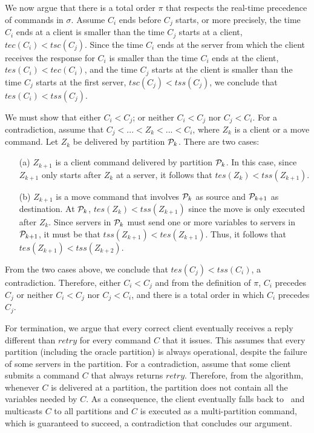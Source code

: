 %
We now argue that there is a total order $\pi$ that respects the real-time precedence of commands in $\sigma$.
Assume $C_i$ ends before $C_j$ starts, or more precisely, the time $C_i$ ends at a client is smaller than the time $C_j$ starts at a client, $tec(C_i) < tsc(C_j)$.
Since the time $C_i$ ends at the server from which the client receives the response for $C_i$ is smaller than the time $C_i$ ends at the client, $tes(C_i) < tec(C_i)$, and the time $C_j$ starts at the client is smaller than the time $C_j$ starts at the first server, $tsc(C_j) < tss(C_j)$, we conclude that $tes(C_i) < tss(C_j)$.

We must show that either $C_i < C_j$; or neither $C_i < C_j$ nor $C_j < C_i$.
For a contradiction, assume that $C_j < ... < Z_k < ... < C_i$, where $Z_k$ is a client or a move command.
Let $Z_k$ be delivered by partition $\mathcal{P}_k$.
There are two cases: 
\begin{enumerate}
\item[(a)] $Z_{k+1}$ is a client command delivered by partition $\mathcal{P}_k$.
In this case, since $Z_{k+1}$ only starts after $Z_k$ at a server, it follows that $tes(Z_k) < tss(Z_{k+1})$.
\item[(b)] $Z_{k+1}$ is a move command that involves $\mathcal{P}_k$ as source and $\mathcal{P}_{k+1}$ as destination.
At $\mathcal{P}_k$, $tes(Z_k) < tss(Z_{k+1})$ since the move is only executed after $Z_k$.
Since servers in $\mathcal{P}_k$ must send one or more variables to servers in $\mathcal{P}_{k+1}$, it must be that $tss(Z_{k+1}) < tes(Z_{k+1})$.
Thus, it follows that $tes(Z_{k+1}) < tss(Z_{k+2})$.
\end{enumerate}
From the two cases above, we conclude that $tes(C_j) < tss(C_i)$, a contradiction.
Therefore, either $C_i < C_j$ and from the definition of $\pi$, $C_i$ precedes $C_j$ or neither $C_i < C_j$ nor $C_j < C_i$, and there is a total order in which $C_i$ precedes $C_j$.

For termination, we argue that every correct client eventually receives a reply different than $retry$ for every command $C$ that it issues.
This assumes that every partition (including the oracle partition) is always operational, despite the failure of some servers in the partition.
For a contradiction, assume that some client submits a command $C$ that always returns $retry$.
Therefore, from the algorithm, whenever $C$ is delivered at a partition, the partition does not contain all the variables needed by $C$.
As a consequence, the client eventually falls back to \ssmr\ and multicasts $C$ to all partitions and $C$ is executed as a multi-partition command, which is guaranteed to succeed, a contradiction that concludes our argument.


